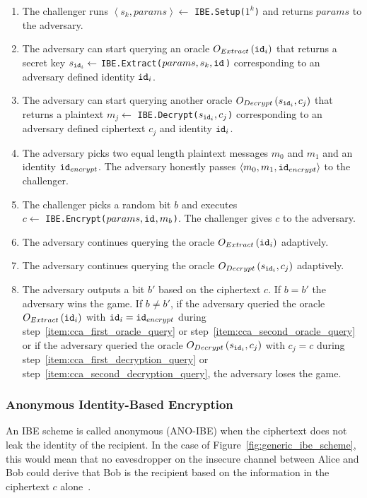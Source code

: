 \begin{algorithm}
 \begin{enumerate}
  \item The challenger runs $\left< s_k, params\right> \leftarrow$ \texttt{IBE.Setup($1^k$)} and returns $params$ to the adversary.
  \item \label{item:cca_first_oracle_query} The adversary can start querying an oracle $O_{Extract} \left( \mathtt{id}_{i} \right)$ that returns a secret key $s_{\mathtt{id}_{i}} \leftarrow$ \texttt{IBE.Extract($params, s_k, \mathtt{id}_{}$)} corresponding to an adversary defined identity $\mathtt{id}_{i}$.
  \item \label{item:cca_first_decryption_query} The adversary can start querying another oracle $O_{Decrypt} \left( s_{\mathtt{id}_{i}}, c_j \right)$ that returns a plaintext $m_j \leftarrow$ \texttt{IBE.Decrypt($s_{\mathtt{id}_{i}}, c_j$)} corresponding to an adversary defined ciphertext $c_j$ and identity $\mathtt{id}_{i}$.
  \item The adversary picks two equal length plaintext messages $m_0$ and $m_1$ and an identity $\mathtt{id}_{encrypt}$. The adversary honestly passes $\left< m_0, m_1, \mathtt{id}_{encrypt} \right>$ to the challenger.
  \item The challenger picks a random bit $b$ and executes \\ $c \leftarrow$ \texttt{IBE.Encrypt($params, \mathtt{id}_{}, m_b$)}. The challenger gives $c$ to the adversary.
  \item \label{item:cca_second_oracle_query} The adversary continues querying the oracle $O_{Extract} \left( \mathtt{id}_{i} \right)$ adaptively.
  \item \label{item:cca_second_decryption_query} The adversary continues querying the oracle $O_{Decrypt} \left( s_{\mathtt{id}_{i}}, c_j \right)$ adaptively.
  \item The adversary outputs a bit $b'$ based on the ciphertext $c$. If $b = b'$ the adversary wins the game. If $b \neq b'$, if the adversary queried the oracle $O_{Extract} \left( \mathtt{id}_{i} \right)$ with $\mathtt{id}_{i} = \mathtt{id}_{encrypt}$ during step~\ref{item:cca_first_oracle_query} or step~\ref{item:cca_second_oracle_query} or if the adversary queried the oracle $O_{Decrypt} \left( s_{\mathtt{id}_{i}}, c_j \right)$ with $c_j = c$ during step~\ref{item:cca_first_decryption_query} or step~\ref{item:cca_second_decryption_query}, the adversary loses the game.
 \end{enumerate}
\end{algorithm}

\subsubsection{Anonymous Identity-Based Encryption}
An IBE scheme is called anonymous (ANO-IBE) when the ciphertext does not leak the identity of the recipient. In the case of Figure~\ref{fig:generic_ibe_scheme}, this would mean that no eavesdropper on the insecure channel between Alice and Bob could derive that Bob is the recipient based on the information in the ciphertext $c$ alone~\cite{art:BoyenW06}.

